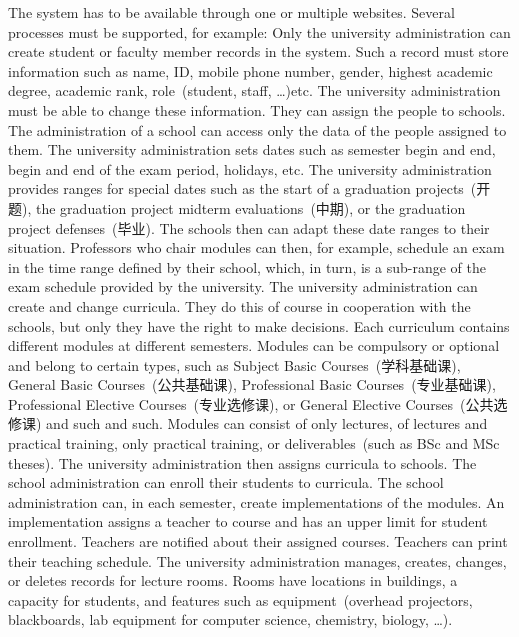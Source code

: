 The system has to be available through one or multiple websites.
Several processes must be supported, for example:%
%
%
Only the university administration can create student or faculty member records in the system.
Such a record must store information such as name, ID, mobile phone number, gender, highest academic degree, academic rank, role~(student, staff, \dots)etc.
The university administration must be able to change these information.
They can assign the people to schools.
The administration of a school can access only the data of the people assigned to them.%
\endhsection%
%
%
The university administration sets dates such as semester begin and end, begin and end of the exam period, holidays, etc.
The university administration provides ranges for special dates such as the start of a graduation projects~(开题), the graduation project midterm evaluations~(中期), or the graduation project defenses~(毕业).
The schools then can adapt these date ranges to their situation.
Professors who chair modules can then, for example, schedule an exam in the time range defined by their school, which, in turn, is a sub-range of the exam schedule provided by the university.%
\endhsection%
%
%
The university administration can create and change curricula.
They do this of course in cooperation with the schools, but only they have the right to make decisions.
Each curriculum contains different modules at different semesters.
Modules can be compulsory or optional and belong to certain types, such as Subject Basic Courses~(学科基础课),
General Basic Courses~(公共基础课),
Professional Basic Courses~(专业基础课),
Professional Elective Courses~(专业选修课), or
General Elective Courses~(公共选修课) and such and such.
Modules can consist of only lectures, of lectures and practical training, only practical training, or deliverables~(such as BSc and MSc theses).
The university administration then assigns curricula to schools.
The school administration can enroll their students to curricula.%
\endhsection%
%
%
The school administration can, in each semester, create implementations of the modules.
An implementation assigns a teacher to course and has an upper limit for student enrollment.
Teachers are notified about their assigned courses.
Teachers can print their teaching schedule.%
\endhsection%
%
%
The university administration manages, creates, changes, or deletes records for lecture rooms.
Rooms have locations in buildings, a capacity for students, and features such as equipment~(overhead projectors, blackboards, lab equipment for computer science, chemistry, biology, \dots).
